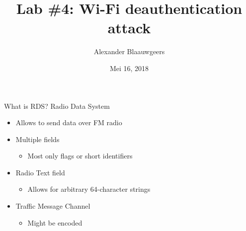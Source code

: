 \documentclass[10pt]{beamer}
\title[]{Lab \#4: Wi-Fi deauthentication attack \\  } %
\author{Alexander Blaauwgeers} %
\institute[University of Amsterdam] %
{
University of Amsterdam \\ %
\medskip
}
\date{Mei 16, 2018} %
\begin{document}
\begin{frame}
\titlepage %
\end{frame}


\begin{frame}{What is RDS?}
Radio Data System

\begin{itemize}
    \item Allows to send data over FM radio
    \item Multiple fields
    \begin{itemize}
        \item Most only flags or short identifiers
    \end{itemize}
    \item Radio Text field
    \begin{itemize}
        \item Allows for arbitrary 64-character strings
    \end{itemize}
    \item Traffic Message Channel
    \begin{itemize}
        \item Might be encoded
    \end{itemize}
\end{itemize}
\end{frame}

\end{document}
